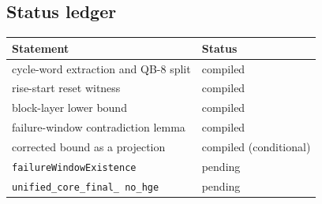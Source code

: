\subsection{Status ledger}

\begin{center}
\small
\begin{tabular}{@{}p{}p{}@{}}
\toprule
Statement & Status \\
\midrule
cycle-word extraction and QB-8 split & compiled \\
rise-start reset witness & compiled \\
block-layer lower bound & compiled \\
failure-window contradiction lemma & compiled \\
corrected bound as a projection & compiled (conditional) \\
\texttt{failureWindowExistence} & pending \\
\texttt{unified\_\allowbreak core\_\allowbreak final\_\allowbreak
no\_\allowbreak hge} & pending \\
\bottomrule
\end{tabular}
\end{center}
